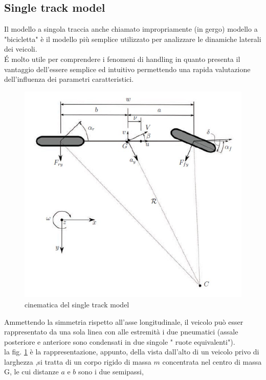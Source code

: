 \subsection{Single track model}
Il modello a singola traccia anche chiamato impropriamente (in gergo) modello a "bicicletta" è il modello più semplice utilizzato per analizzare le dinamiche laterali dei veicoli.\\
\'E molto utile per comprendere i fenomeni di handling in quanto presenta il vantaggio dell'essere semplice ed intuitivo permettendo una rapida valutazione dell'influenza dei parametri caratteristici.\\
\begin{figure}[!h]
    \centering
    \includegraphics[scale=0.7]{Immagini/Lateral dynamics/Single_track_model.jpg}
    \caption{cinematica del single track model}
    \label{fig:Single track model}
\end{figure}
Ammettendo la simmetria rispetto all’asse longitudinale,
il veicolo può esser rappresentato da una sola linea con alle estremità i due
pneumatici (assale posteriore e anteriore sono condensati in due singole "
ruote equivalenti").\\
la fig. \ref{fig:Single track model} è la rappresentazione, appunto, della vista dall'alto di un veicolo privo di larghezza ,si tratta di un corpo rigido di massa $m$ concentrata nel centro di massa G, le cui distanze $a$ e $b$ sono i due semipassi,
